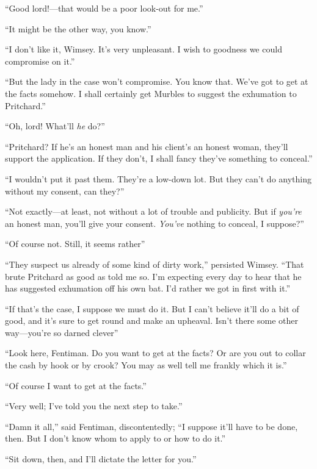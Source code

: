 \enquote{Good lord!---that would be a poor look-out for me.}

\enquote{It might be the other way, you know.}

\enquote{I don't like it, Wimsey. It's very unpleasant. I wish to goodness we could compromise on it.}

\enquote{But the lady in the case won't compromise. You know that. We've got to get at the facts somehow. I shall certainly get Murbles to suggest the exhumation to Pritchard.}

\enquote{Oh, lord! What'll \textit{he} do?}

\enquote{Pritchard? If he's an honest man and his client's an honest woman, they'll support the application. If they don't, I shall fancy they've something to conceal.}

\enquote{I wouldn't put it past them. They're a low-down lot. But they can't do anything without my consent, can they?}

\enquote{Not exactly\allowbreak---\allowbreak at least, not without a lot of trouble and publicity. But if \textit{you're} an honest man, you'll give your consent. \textit{You've} nothing to conceal, I suppose?}

\enquote{Of course not. Still, it seems rather\longdash}

\enquote{They suspect us already of some kind of dirty work,} persisted Wimsey. \enquote{That brute Pritchard as good as told me so. I'm expecting every day to hear that he has suggested exhumation off his own bat. I'd rather we got in first with it.}

\enquote{If that's the case, I suppose we must do it. But I can't believe it'll do a bit of good, and it's sure to get round and make an upheaval. Isn't there some other way\allowbreak---\allowbreak you're so darned clever\longdash}

\enquote{Look here, Fentiman. Do you want to get at the facts? Or are you out to collar the cash by hook or by crook? You may as well tell me frankly which it is.}

\enquote{Of course I want to get at the facts.}

\enquote{Very well; I've told you the next step to take.}

\enquote{Damn it all,} said Fentiman, discontentedly; \enquote{I suppose it'll have to be done, then. But I don't know whom to apply to or how to do it.}

\enquote{Sit down, then, and I'll dictate the letter for you.}

